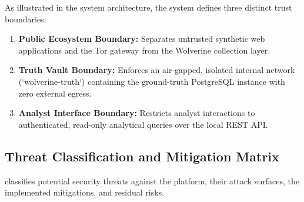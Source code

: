 As illustrated in the system architecture, the system defines three distinct trust boundaries:
\begin{enumerate}
    \item \textbf{Public Ecosystem Boundary:} Separates untrusted synthetic web applications and the Tor gateway from the Wolverine collection layer.
    \item \textbf{Truth Vault Boundary:} Enforces an air-gapped, isolated internal network (`wolverine-truth`) containing the ground-truth PostgreSQL instance with zero external egress.
    \item \textbf{Analyst Interface Boundary:} Restricts analyst interactions to authenticated, read-only analytical queries over the local REST API.
\end{enumerate}

\subsection{Threat Classification and Mitigation Matrix}
 classifies potential security threats against the platform, their attack surfaces, the implemented mitigations, and residual risks.

